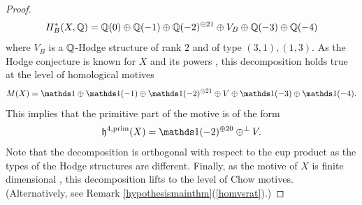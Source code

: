 \documentclass[11pt]{amsart}
\begin{document}
\begin{appendices}
\begin{proof}
\[H_B^*(X,\mathbb{Q})=\mathbb{Q}(0) \oplus \mathbb{Q}(-1) \oplus \mathbb{Q}(-2)^{\oplus 21} \oplus V_B \oplus \mathbb{Q}(-3) \oplus \mathbb{Q}(-4)\]
where   $V_B$ is a $\mathbb{Q}$-Hodge structure of rank $2$ and of type $(3,1), (1,3)$.
As the Hodge conjecture is known for $X$ and its powers \cite{ShioC}, this decomposition holds true at the level of homological motives
\[M(X)=\one  \oplus \one(-1) \oplus \one(-2)^{\oplus 21} \oplus V \oplus \one(-3) \oplus \one(-4).\]
This implies that the primitive part of the motive  is of the form
\[\mathfrak{h}^{4,\prim}(X)= \one(-2)^{\oplus 20} \oplus^{\perp} V.\]
Note that the decomposition is orthogonal with respect to the cup product as the types of the Hodge structures   are different.
Finally, as the motive of $X$ is finite dimensional \cite[Lemma 5.2]{BLP}, this decomposition lifts to the level of Chow motives. (Alternatively, see Remark \ref{hypothesismainthm}(\ref{homvsrat}).)


\end{proof}
\end{appendices}
\end{document}
